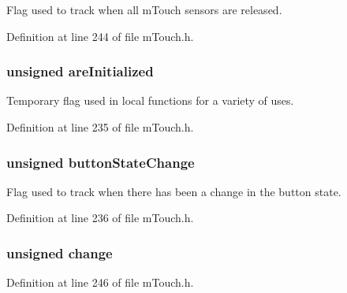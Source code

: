 Flag used to track when all m\+Touch sensors are released. 



Definition at line 244 of file m\+Touch.\+h.

\hypertarget{structm_touch___state_ab1320a2e9a938dad2a563147945e97f9}{}
\subsubsection[{are\+Initialized}]{\setlength{\rightskip}{0pt plus 5cm}unsigned are\+Initialized}\label{structm_touch___state_ab1320a2e9a938dad2a563147945e97f9}


Temporary flag used in local functions for a variety of uses. 



Definition at line 235 of file m\+Touch.\+h.

\hypertarget{structm_touch___state_a915c76d157542b9acb3bfca42e0c4913}{}
\subsubsection[{button\+State\+Change}]{\setlength{\rightskip}{0pt plus 5cm}unsigned button\+State\+Change}\label{structm_touch___state_a915c76d157542b9acb3bfca42e0c4913}


Flag used to track when there has been a change in the button state. 



Definition at line 236 of file m\+Touch.\+h.

\hypertarget{structm_touch___state_a61dd6125b007d7733bc098cb13c056d3}{}
\subsubsection[{change}]{\setlength{\rightskip}{0pt plus 5cm}unsigned change}\label{structm_touch___state_a61dd6125b007d7733bc098cb13c056d3}


Definition at line 246 of file m\+Touch.\+h.

\hypertarget{structm_touch___state_af799217cbdcc2ac20907a19c9b62a0d5}{}
